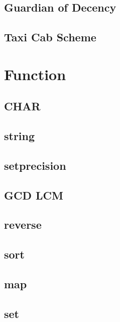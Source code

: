         \subsection{Guardian of Decency}
                
        \subsection{Taxi Cab Scheme}
                

\section{Function}
        \subsection{CHAR}
                
        \subsection{string}
                
        \subsection{setprecision}
                
        \subsection{GCD LCM}
                
        \subsection{reverse}
                
        \subsection{sort}
                
        \subsection{map}
                
        \subsection{set}
                